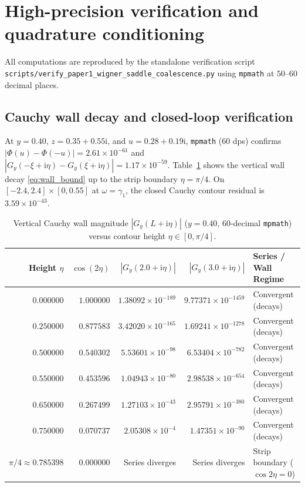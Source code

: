 \documentclass[11pt,a4paper,reqno]{amsart}
\theoremstyle{definition}
\theoremstyle{remark}
\numberwithin{equation}{section}
\newcommand{\ii}{\mathrm{i}}
\begin{document}
\section{High-precision verification and quadrature conditioning}\label{sec:numerics}

All computations are reproduced by the standalone verification script \nolinkurl{scripts/verify_paper1_wigner_saddle_coalescence.py} using \texttt{mpmath} at $50$--$60$ decimal places.

\subsection{Cauchy wall decay and closed-loop verification}

At $y = 0.40$, $z = 0.35 + 0.55\ii$, and $u = 0.28 + 0.19\ii$, \texttt{mpmath} ($60$ dps) confirms $|\Phi(u)-\Phi(-u)| = 2.61 \times 10^{-61}$ and $|G_y(-\xi+\ii\eta) - \overline{G_y(\xi+\ii\eta)}| = 1.17 \times 10^{-59}$. Table~\ref{tab:wall_decay} shows the vertical wall decay \eqref{eq:wall_bound} up to the strip boundary $\eta = \pi/4$. On $[-2.4, 2.4] \times [0, 0.55]$ at $\omega = \gamma_1$, the closed Cauchy contour residual is $3.59 \times 10^{-43}$.

\begin{table}[htbp]
\centering
\caption{Vertical Cauchy wall magnitude $|G_y(L+\ii\eta)|$ ($y = 0.40$, $60$-decimal \texttt{mpmath}) versus contour height $\eta \in [0, \pi/4]$.}\label{tab:wall_decay}
\footnotesize
\begin{tabular}{rrrrl}
\toprule
\textbf{Height $\eta$} & $\cos(2\eta)$ & $|G_y(2.0 + \ii\eta)|$ & $|G_y(3.0 + \ii\eta)|$ & \textbf{Series / Wall Regime} \\
\midrule
$0.000000$ & $1.000000$ & $1.38092 \times 10^{-189}$ & $9.77371 \times 10^{-1459}$ & Convergent (decays) \\
$0.250000$ & $0.877583$ & $3.42020 \times 10^{-165}$ & $1.69241 \times 10^{-1278}$ & Convergent (decays) \\
$0.500000$ & $0.540302$ & $5.53601 \times 10^{-98}$  & $6.53404 \times 10^{-782}$  & Convergent (decays) \\
$0.550000$ & $0.453596$ & $1.04943 \times 10^{-80}$  & $2.98538 \times 10^{-654}$  & Convergent (decays) \\
$0.650000$ & $0.267499$ & $1.27103 \times 10^{-43}$  & $2.95791 \times 10^{-380}$  & Convergent (decays) \\
$0.750000$ & $0.070737$ & $2.05308 \times 10^{-4}$   & $1.47351 \times 10^{-90}$   & Convergent (decays) \\
$\pi/4 \approx 0.785398$ & $0.000000$ & Series diverges & Series diverges & Strip boundary ($\cos 2\eta = 0$) \\
\bottomrule
\end{tabular}
\end{table}
\end{document}
